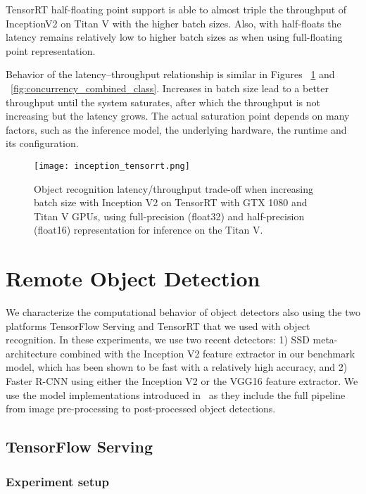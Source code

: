\documentclass[sigconf]{acmart}
\begin{document}
TensorRT half-floating point support is able to almost triple the throughput of InceptionV2 on Titan V with the higher batch sizes. Also, with half-floats the latency remains relatively low to higher batch sizes as when using full-floating point representation.

Behavior of the latency--throughput relationship is similar in Figures ~\ref{fig:inception_tensorrt} and ~\ref{fig:concurrency_combined_class}. Increases in batch size lead to a better throughput until the system saturates, after which the throughput is not increasing but the latency grows. The actual saturation point depends on many factors, such as the inference model, the underlying hardware, the runtime and its configuration.

\begin{figure}[t]
\centering
\texttt{[image: inception\_tensorrt.png]}
\caption{Object recognition latency/throughput trade-off when increasing batch size with Inception V2 on TensorRT with GTX 1080 and Titan V GPUs, using full-precision (float32) and half-precision (float16) representation for inference on the Titan V.}
\label{fig:inception_tensorrt}
\end{figure}

\section{Remote Object Detection}\label{sec:detection}We characterize the computational behavior of object detectors also using the two platforms TensorFlow Serving and TensorRT that we used with object recognition.
In these experiments, we use two recent detectors: 1) SSD meta-architecture combined with the Inception V2 feature extractor in our benchmark model, which has been shown to be fast with a relatively high accuracy, and 2) Faster R-CNN using either the Inception V2 or the VGG16 feature extractor.
We use the model implementations introduced in~\cite{Huang2017CVPR} as they include the full pipeline from image pre-processing to post-processed object detections.

\subsection{TensorFlow Serving}\label{sec:TF_serving}\subsubsection{Experiment setup}
\end{document}
